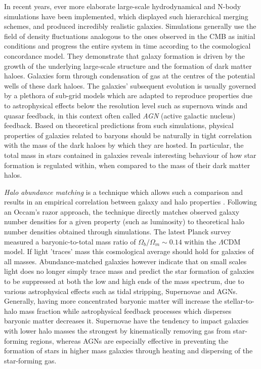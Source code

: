 In recent years, ever more elaborate large-scale hydrodynamical and N-body
simulations have been implemented, which displayed such hierarchical merging
schemes, and produced incredibly realistic galaxies.  Simulations generally use
the field of density fluctuations analogous to the ones observed in the CMB as
initial conditions and progress the entire system in time according to the
cosmological concordance model.  They demonstrate that galaxy formation is
driven by the growth of the underlying large-scale structure and the formation
of dark matter haloes.  Galaxies form through condensation of gas at the centres
of the potential wells of these dark haloes.  The galaxies' subsequent evolution
is usually governed by a plethora of sub-grid models which are adapted to
reproduce properties due to astrophysical effects below the resolution level
such as supernova winds and quasar feedback, in this context often called
\textit{AGN} (active galactic nucleus) feedback.  Based on theoretical
predictions from such simulations, physical properties of galaxies related to
baryons  should be naturally in tight
correlation with the mass of the dark haloes by which they are hosted.  In
particular, the total mass in stars contained in galaxies reveals interesting
behaviour of how star formation is regulated within, when compared to the mass
of their dark matter halos.

\textit{Halo abundance matching} is a technique which allows such a comparison
and results in an empirical correlation between galaxy and halo properties
.  Following an Occam’s razor approach, the technique
directly matches observed galaxy number densities for a given property (such as
luminosity) to theoretical halo number densities obtained through simulations.
The latest Planck survey  measured a baryonic-to-total mass
ratio of $\Omega_{b}/\Omega_{m} \sim 0.14$ within the $\Lambda$CDM model.  If
light 'traces' mass this cosmological average should hold for galaxies of all
masses.  Abundance-matched galaxies however indicate that on small scales light
does no longer simply trace mass and predict the star formation of galaxies to
be suppressed at both the low and high ends of the mass spectrum, due to various
astrophysical effects such as tidal stripping, Supernovae and AGNs.  Generally, having more concentrated baryonic
matter will increase the stellar-to-halo mass fraction while astrophysical
feedback processes which disperses baryonic matter decreases it.  Supernovae
have the tendency to impact galaxies with lower halo masses the strongest by
kinematically removing gas from star-forming regions, whereas AGNs are
especially effective in preventing the formation of stars in higher mass
galaxies through heating and dispersing of the star-forming gas.

